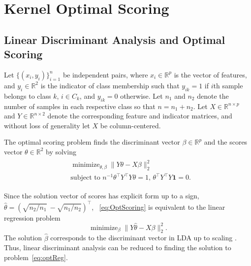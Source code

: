 \documentclass[twoside, onecolumn]{article}
\def\R{\mathbb{R}}
\DeclareMathOperator*{\minimize}{minimize}
\begin{document}
\section{Kernel Optimal Scoring}\label{sec:rKOS}
\subsection{Linear Discriminant Analysis and Optimal Scoring }\label{sec:LDA}


Let $\{(x_i, y_i)\}_{i=1}^{n}$ be independent pairs, where $x_i\in \R^p$ is the vector of features, and $y_i\in \R^2$ is the indicator of class membership such that $y_{ik} = 1$ if $i$th sample belongs to class $k$, $i\in C_k$, and $y_{ik} = 0$ otherwise. Let $n_1$ and $n_2$ denote the number of samples in each respective class so that $n = n_1 + n_2$. Let $X\in \mathbb{R}^{n\times p}$ and $Y\in\mathbb{R}^{n\times 2}$ denote the corresponding feature and indicator matrices, and without loss of generality let $X$ be column-centered.

The optimal scoring problem \cite{Hastie:1994cx} finds the discriminant vector $\beta \in \R^p$ and the scores vector $\theta \in \R^2$ by solving
\begin{align}\label{eq:OptScoring}
\begin{split}
&\minimize_{\theta, \beta}\|Y\theta-X\beta\|_{2}^{2}\\
&\text{subject to }n^{-1}\theta^{\top}Y^{\top}Y\theta=1,\,\theta^{\top}Y^{\top}Y \mathbf{1}=0.
\end{split}
\end{align}

Since the solution vector of scores has explicit form up to a sign, $\widehat \theta = (\sqrt{n_2/n_1}\ -\sqrt{n_1/n_2})^{\top}$, ~\eqref{eq:OptScoring} is equivalent to the linear regression problem
\begin{equation}\label{eq:optReg}
\minimize_{\beta}\|Y\widehat \theta - X\beta\|_2^2.
\end{equation}
The solution $\widehat \beta$ corresponds to the discriminant vector in LDA up to scaling \cite[Section 3.4]{hastie_penalized_1995}. Thus, linear discriminant analysis can be reduced to finding the solution to problem~\eqref{eq:optReg}.
\end{document}
